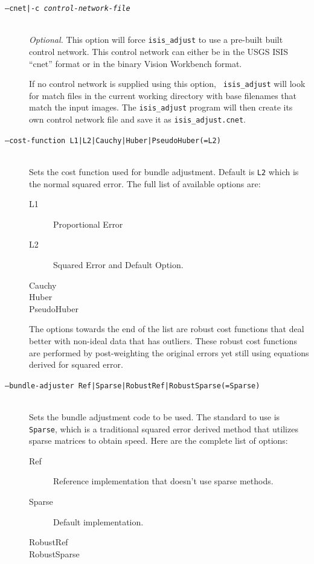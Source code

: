 \begin{description}

\item[\texttt{--cnet|-c \textit{control-network-file}}] \hfill \\
  \emph{Optional.} This option will force {\tt isis\_adjust} to
  use a pre-built built control network. This control network can
  either be in the \ac{USGS} \ac{ISIS} ``cnet'' format or in the binary Vision
  Workbench format.

  If no control network is supplied using this option, {\tt
    isis\_adjust} will look for match files in the current working
  directory with base filenames that match the input images.  The
  \texttt{isis\_adjust} program will then create its own control
  network file and save it as \texttt{isis\_adjust.cnet}.

\item[\texttt{--cost-function L1|L2|Cauchy|Huber|PseudoHuber(=L2)} ] \hfill \\
  Sets the cost function used for bundle adjustment. Default is \texttt{L2}
  which is the normal squared error. The full list of available options
  are:

  \begin{description}
    \item[L1] Proportional Error
    \item[L2] Squared Error and Default Option.
    \item[Cauchy]
    \item[Huber]
    \item[PseudoHuber]
  \end{description}

  The options towards the end of the list are robust cost functions
  that deal better with non-ideal data that has outliers. These robust
  cost functions are performed by post-weighting the original errors yet
  still using equations derived for squared error.

\item[\texttt{--bundle-adjuster Ref|Sparse|RobustRef|RobustSparse(=Sparse)}] \hfill \\
  Sets the bundle adjustment code to be used. The standard to use is
  \texttt{Sparse}, which is a traditional squared error derived method that
  utilizes sparse matrices to obtain speed. Here are the complete list
  of options:

  \begin{description}
    \item[Ref] Reference implementation that doesn't use sparse methods.
    \item[Sparse] Default implementation.
    \item[RobustRef]
    \item[RobustSparse]
  \end{description}


\end{description}
